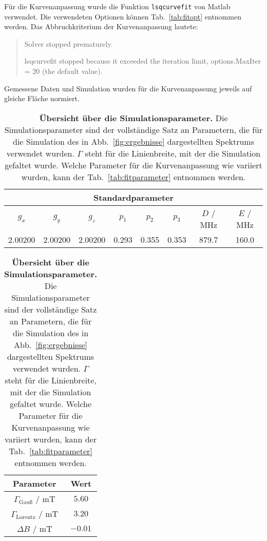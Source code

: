 \documentclass{article}
\newcommand{\matlab}{\textsf{Matlab}}
\begin{document}
\clearpage


Für die Kurvenanpassung wurde die Funktion \texttt{lsqcurvefit} von \matlab{} verwendet. Die verwendeten Optionen können Tab.~\ref{tab:fitopt} entnommen werden. Das Abbruchkriterium der Kurvenanpassung lautete:

\begin{quote}\small
\ttfamily
Solver stopped prematurely.

lsqcurvefit stopped because it exceeded the iteration limit,
options.MaxIter = 20 (the default value).
\end{quote}

Gemessene Daten und Simulation wurden für die Kurvenanpassung jeweils auf gleiche Fläche normiert.

\begin{table}[h]
\caption{\textbf{Übersicht über die Simulationsparameter.} Die Simulationsparameter sind der vollständige Satz an Parametern, die für die Simulation des in Abb.~\ref{fig:ergebnisse} dargestellten Spektrums verwendet wurden. $\Gamma$ steht für die Linienbreite, mit der die Simulation gefaltet wurde. Welche Parameter für die Kurvenanpassung wie variiert wurden, kann der Tab.~\ref{tab:fitparameter} entnommen werden.}
\label{tab:simparameter}
\centering
\begin{tabular}{cccccccc} 
\toprule
\multicolumn{8}{c}{\textbf{Standardparameter} }
\\
\midrule 
$g_x$      & $g_y$      & $g_z$      & $p_1$   & $p_2$   & $p_3$   & $D$ / MHz & $E$ / MHz \\
2.00200 & 2.00200 & 2.00200 & 0.293 & 0.355 & 0.353 &   879.7  &   160.0     \\ 
\bottomrule
\end{tabular}

\begin{tabular}{cc}
\toprule
\textbf{Parameter} & \textbf{Wert}
\\
\midrule

$\Gamma_\text{Gauß}$ / mT & $5.60$
\\

$\Gamma_\text{Lorentz}$ / mT & $3.20$
\\

$\Delta B$ / mT & $-0.01$
\\

\bottomrule
\end{tabular}
\end{table}
\end{document}
